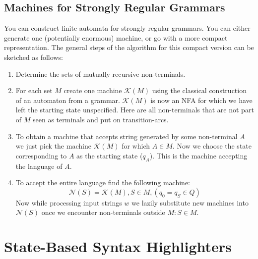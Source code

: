 	\subsection{Machines for Strongly Regular Grammars}	\label{sec:ComponentMachine}
	You can construct finite automata for strongly regular grammars. You can either generate one (potentially enormous) machine, or go with a more compact representation. The general steps of the algorithm for this compact version can be sketched as follows:
	\begin{enumerate}
		\item Determine the sets of mutually recursive non-terminals. 
		\item For each set $M$ create one machine $\mathcal{K}(M)$ using the classical construction of an automaton from a grammar. $\mathcal{K}(M)$ is now an NFA for which we have left the starting state unspecified. Here are all non-terminals that are not part of $M$ seen as terminals and put on transition-arcs. 
		\item To obtain a machine that accepts string generated by some non-terminal $A$ we just pick the machine $\mathcal{K}(M)$ for which $A \in M$. Now we choose the state corresponding to $A$ as the starting state ($q_A$). This is the machine accepting the language of $A$.
		\item To accept the entire language find the following machine:
		\subitem \begin{equation*}\mathcal{N}(S) = \mathcal{K}(M) , S \in M , (q_0 = q_S \in Q)\end{equation*}
		Now while processing input strings $w$ we lazily substitute new machines into $\mathcal{N}(S)$ once we encounter non-terminals outside $M : S \in M$.
	\end{enumerate}
	
\pagebreak

\section{State-Based Syntax Highlighters}
